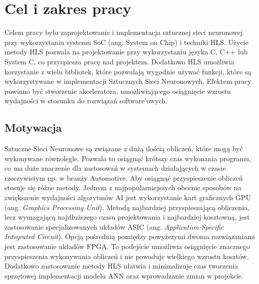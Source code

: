\newpage %
\cleardoublepage %
\pagestyle{headings}

\section{Cel i zakres pracy}
Celem pracy było zaprojektowanie i implementacja sztucznej sieci neuronowej 
przy wykorzystaniu systemu SoC (ang. System on Chip) i techniki HLS. 
Użycie metody HLS pozwala na projektowanie  przy wykorzystaniu języka 
C, C++ lub System C, co przyspiesza pracę nad projektem. Dodatkowo HLS umożliwia
korzystanie z wielu bibliotek, które pozwalają wygodnie używać funkcji,
które są wykorzystywane w implementacji Sztucznych Sieci Neuronowych. 
Efektem pracy powinno być stworzenie akceleratora, umożliwiającego osiągnięcie 
wzrostu wydajności w stosunku do rozwiązań software’owych.

\subsection{Motywacja}
Sztuczne Sieci Neuronowe są związane z dużą ilością obliczeń, które mogą 
być wykonywane równolegle. Pozwala to osiągnąć krótszy czas wykonania 
programu, co ma duże znaczenie dla zastosowań w systemach działających 
w czasie rzeczywistym np. w branży Automotive. Aby osiągnąć przyspieszenie 
obliczeń stosuje się różne metody. Jednym z najpopularniejszych obecnie sposobów 
na zwiększenie wydajności algorytmów AI jest wykorzystanie kart graficznych GPU 
(ang. \emph{Graphics Processing Unit}). Metodą najbardziej przyspieszającą obliczenia,
lecz wymagającą najdłuższego czasu projektowania i najbardziej kosztowną,
jest zastosowanie specjalizowanych układów ASIC (ang. \emph{Application-Specific 
Integrated Circuit}). Opcją pośrednią pomiędzy powyższymi dwoma rozwiązaniami
jest zastosowanie układów FPGA. To podejście umożliwia osiągnięcie znacznego
przyspieszenia wykonywania obliczeń i nie powoduje wielkiego wzrostu kosztów. Dodatkowo 
zastosowanie metody HLS ułatwia i minimalizuje czas tworzenia sprzętowej implementacji 
modelu ANN oraz wprowadzanie zmian w projekcie. 
